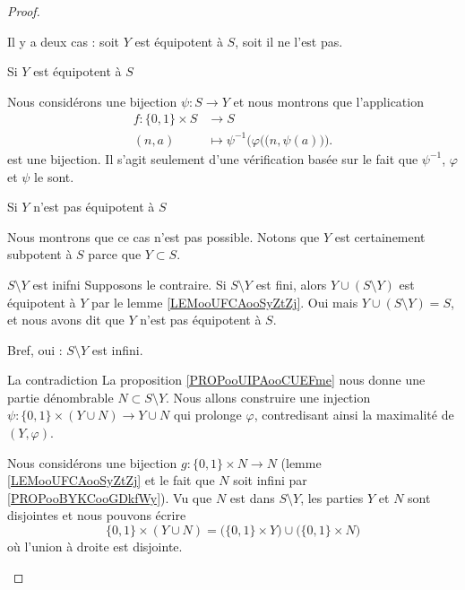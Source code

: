\begin{proof}
\begin{subproof}
            Il y a deux cas : soit \( Y\) est équipotent à \( S\), soit il ne l'est pas.

        \item[Si \( Y\) est équipotent à \( S\)]

            Nous considérons une bijection \( \psi\colon S\to Y\) et nous montrons que l'application
            \begin{equation}
                \begin{aligned}
                    f\colon \{ 0,1 \}\times S&\to S \\
                    (n,a)&\mapsto \psi^{-1}\Big( \varphi\big( (n,\psi(a)\big) \Big) .
                \end{aligned}
            \end{equation}
            est une bijection. Il s'agit seulement d'une vérification basée sur le fait que \( \psi^{-1}\), \( \varphi\) et \( \psi\) le sont.

        \item[Si \( Y\) n'est pas équipotent à \( S\)]

            Nous montrons que ce cas n'est pas possible. Notons que \( Y\) est certainement subpotent à \( S\) parce que \( Y\subset S\).
            \begin{subproof}
                \item[\( S\setminus Y\) est inifni]
                    Supposons le contraire. Si \( S\setminus Y\) est fini, alors \( Y\cup(S\setminus Y)\) est équipotent à \( Y\) par le lemme \ref{LEMooUFCAooSyZtZj}. Oui mais \( Y\cup(S\setminus Y)=S\), et nous avons dit que \( Y\) n'est pas équipotent à \( S\).

                    Bref, oui : \( S\setminus Y\) est infini.

                \item[La contradiction]
                    La proposition \ref{PROPooUIPAooCUEFme} nous donne une partie dénombrable \( N\subset S\setminus Y\). Nous allons construire une injection \( \psi\colon \{ 0,1 \}\times (Y\cup N)\to Y\cup N\) qui prolonge \( \varphi\), contredisant ainsi la maximalité de \( (Y,\varphi)\).

                    Nous considérons une bijection \( g\colon \{ 0,1 \}\times N\to N\) (lemme \ref{LEMooUFCAooSyZtZj} et le fait que \( N\) soit infini par \ref{PROPooBYKCooGDkfWy}). Vu que \( N\) est dans \( S\setminus Y\), les parties \( Y\) et \( N\) sont disjointes et nous pouvons écrire
                    \begin{equation}
                        \{ 0,1 \}\times (Y\cup N)=\big( \{ 0,1 \}\times Y \big)\cup\big( \{ 0,1 \}\times N \big)
                    \end{equation}
                    où l'union à droite est disjointe.


\end{subproof}
\end{subproof}
\end{proof}
